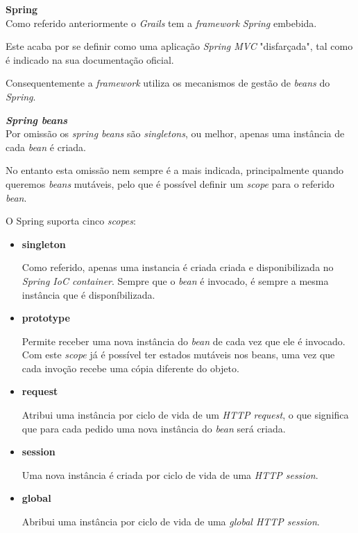 \textbf{\large{Spring}}\\

  Como referido anteriormente o \textit{Grails} tem a \textit{framework} \textit{Spring} embebida. 

  Este acaba por se definir como uma aplicação \textit{Spring MVC} "disfarçada", tal como é indicado na sua documentação oficial.

  Consequentemente a \textit{framework} utiliza os mecanismos de gestão de \textit{beans} do \textit{Spring}.

  \textbf{\textit{Spring beans}}\\
  
  Por omissão os \textit{spring beans} são \textit{singletons}, ou melhor, apenas uma instância de cada \textit{bean} é criada.

  No entanto esta omissão nem sempre é a mais indicada, principalmente quando queremos \textit{beans} mutáveis, pelo que é possível definir um \textit{scope} para o referido \textit{bean}.  

  O Spring suporta cinco \textit{scopes}:

  \begin{itemize}
    \item \textbf{singleton}

      Como referido, apenas uma instancia é criada criada e disponibilizada no \textit{Spring IoC container}. Sempre que o \textit{bean} é invocado, é sempre a mesma instância que é disponíbilizada.

    \item \textbf{prototype}

      Permite receber uma nova instância do \textit{bean} de cada vez que ele é invocado. Com este \textit{scope} já é possível ter estados mutáveis nos beans, uma vez que cada invoção recebe uma cópia diferente do objeto.

    \item \textbf{request}

      Atribui uma instância por ciclo de vida de um \textit{HTTP request}, o que significa que para cada pedido uma nova instância do \textit{bean} será criada.

    \item \textbf{session}

      Uma nova instância é criada por ciclo de vida de uma \textit{HTTP session}.

    \item \textbf{global}

      Abribui uma instância por ciclo de vida de uma \textit{global HTTP session}.

  \end{itemize}

